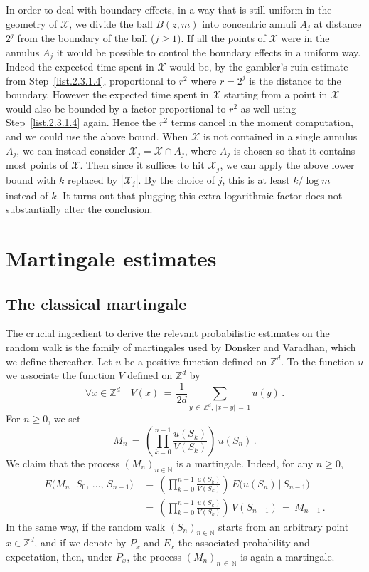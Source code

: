 \documentclass[10pt]{amsart}
\theoremstyle{definition}\newtheorem{defi}[theo]{Definition}\newtheorem{rema}[theo]{Remark}\newtheorem{exam}[theo]{Example}\newtheorem{exem}[theo]{Example}\newtheorem{nota}[theo]{Notation}
\newcommand*\Zd {{\mathbb Z^d}}
\newcommand*\N {{\mathbb N}}
\newcommand{\cX}{\mathcal{X}}
\renewcommand{\N}{\mathbb{N}}
\let\oldforall\forall
\renewcommand*{\forall}{\mathrel{\oldforall}}
\begin{document}
In order to deal with boundary effects, in a way that is still uniform in the geometry of $\cX$, we divide the ball $B(z, m)$ into concentric annuli $A_j$ at distance $2^j$ from the boundary of the ball ($j \ge 1$). If all the points of $\cX$ were in the annulus $A_j$ it would be possible to control the boundary effects in a uniform way. Indeed the expected time spent in $\cX$ would be, by the gambler's ruin estimate from Step~\eqref{list.2.3.1.4}, proportional to $r^2$ where $r = 2^j$ is the distance to the boundary. However the expected time spent in $\cX $ starting from a point in $\cX$ would also be bounded by a factor proportional to $r^2$ as well using Step~\eqref{list.2.3.1.4} again. Hence the $r^2$ terms cancel in the moment computation, and we could use the above bound. When $\cX$ is not contained in a single annulus $A_j$, we can instead consider $\cX_j = \cX \cap A_j$, where $A_j$ is chosen so that it contains most points of $\cX$. Then since it suffices to hit $\cX_j$, we can apply the above lower bound with $k$ replaced by $|\cX_j|$. By the choice of $j$, this is at least $k /\log m$ instead of $k$. It turns out that plugging this extra logarithmic factor does not substantially alter the conclusion.


\section{Martingale estimates}\label{S:DV}


\subsection{The classical martingale}\label{clama}
The crucial ingredient to derive the relevant probabilistic estimates on the random walk is the family of martingales used by Donsker and Varadhan, which we define thereafter. Let $u$ be a positive function defined on $\Zd$. To the function $u$ we associate the function $V$ defined on $\Zd$ by
\[
\forall x\in\Zd\quad V(x)\,=\,\frac{1}{2d}
\sum_{{y\,\in\,\Zd},\,{|x-y|\,=\,1}}u(y)\,.
\]
For $n\geq 0$, we set
\[
M_n\,=\,\left(
\prod_{k=0}^{n-1}\frac{u(S_k)}{V(S_k)}\right)\,u(S_n)\,.
\]
We claim that the process $(M_n)_{n\in\N}$ is a martingale. Indeed, for any $n\geq 0$,
\begin{align*}
E\big(M_n\,\big|\,S_0,\,\dots,\,S_{n-1}\big)\,&=\,
\left(\prod_{k=0}^{n-1}\frac{u(S_k)}{V(S_k)}\right)\, E\big(u(S_n)\,|\,S_{n-1}\big)\\
\,&=\,\left(\prod_{k=0}^{n-1}\frac{u(S_k)}{V(S_k)}\right)\, V(S_{n-1})\,=\,M_{n-1}\,.
\end{align*}
In the same way, if the random walk $(S_n)_{n\in\N}$ starts from an arbitrary point $x\in\Zd$, and if we denote by $P_x$ and $E_x$ the associated probability and expectation, then, under $P_x$, the process $(M_n)_{n\,\in\,\N}$ is again a martingale.
\end{document}
